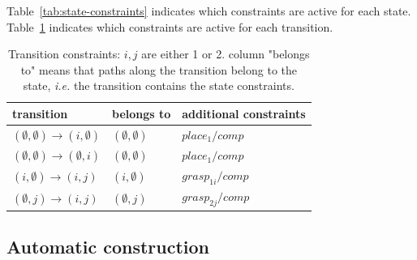 Table~\ref{tab:state-constraints} indicates which constraints are active for each state. Table~\ref{tab:transition-constraints} indicates which constraints are active for each transition.

\begin{table}
  \begin{center}
    \begin{tabular}{|p{.25\linewidth}|p{.18\linewidth}|p{.41\linewidth}|}
      \hline
      transition & belongs to & additional constraints\\
      \hline
      $(\emptyset,\emptyset)\rightarrow (i,\emptyset)$ & $(\emptyset,\emptyset)$ & $place_1/comp$\\
      $(\emptyset,\emptyset)\rightarrow (\emptyset,i)$ & $(\emptyset,\emptyset)$ & $place_1/comp$\\
      $(i,\emptyset)\rightarrow(i,j)$ & $(i,\emptyset)$ & $grasp_{1i}/comp$\\
      $(\emptyset,j)\rightarrow(i,j)$ & $(\emptyset,j)$ & $grasp_{2j}/comp$\\
      \hline
    \end{tabular}
  \end{center}
  \caption{Transition constraints: $i,j$ are either 1 or 2. column
    "belongs to" means that paths along the transition belong to the
    state, \textit{i.e.} the transition contains the state
    constraints.}
  \label{tab:transition-constraints}
\end{table}

\subsection{Automatic construction}

